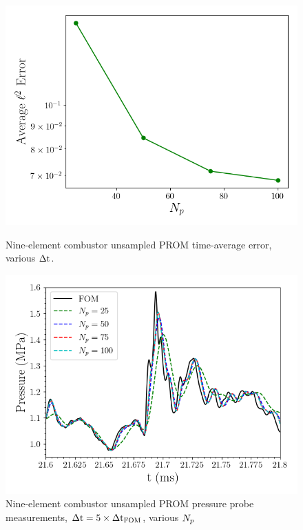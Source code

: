 \begin{figure}
	\begin{minipage}{0.49\linewidth}
		\includegraphics[width=0.99\linewidth]{Chapters/HPROMResults/Images/nineElem/unsampled/unsampled_avg_mode_Average_errorRaw.png}
		\caption{\label{fig:nineElemUnsampledError}Nine-element combustor unsampled PROM time-average error, various $\Delta \text{t}$.}
	\end{minipage}
	\begin{minipage}{0.49\linewidth}
		\includegraphics[width=0.99\linewidth]{Chapters/HPROMResults/Images/nineElem/unsampled/pressure_probe_unsampled_modes.png}
		\caption{\label{fig:nineElemUnsampledProbe}Nine-element combustor unsampled PROM pressure probe measurements, $\Delta \text{t} = 5 \times \Delta \text{t}_{\text{FOM}}$, various $N_p$}
	\end{minipage}
\end{figure}

